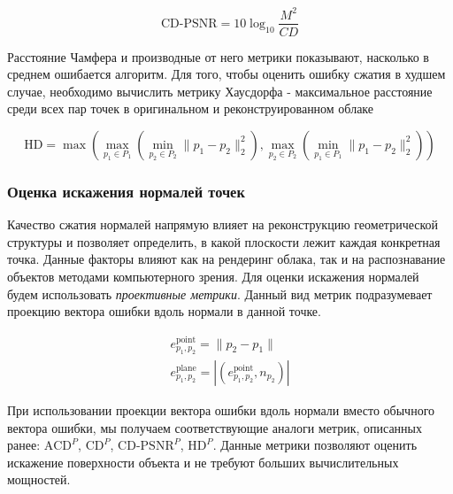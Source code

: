 \begin{equation} \label{eq:cd_psnr_chamfer}
    \text{CD-PSNR} = 10 \log_{10} \frac{M^{2}}{CD}
\end{equation}


Расстояние Чамфера и производные от него метрики показывают, насколько в среднем
ошибается алгоритм. Для того, чтобы оценить ошибку сжатия в худшем случае,
необходимо вычислить метрику Хаусдорфа - максимальное расстояние среди всех пар
точек в оригинальном и реконструированном облаке

\begin{equation} \label{eq:cloud_hausdorff}
    \text{HD} = \max \left(
        \max_{p_{1} \in P_{1}} \left(
            \min_{p_{2} \in P_{2}} \lVert p_{1} - p_{2} \rVert_{2}^{2}
         \right),
        \max_{p_{2} \in P_{2}} \left(
            \min_{p_{1} \in P_{1}} \lVert p_{1} - p_{2} \rVert_{2}^{2}
         \right)
    \right)
\end{equation}

\subsubsection{Оценка искажения нормалей точек}


Качество сжатия нормалей напрямую влияет на реконструкцию геометрической
структуры и позволяет определить, в какой плоскости лежит каждая конкретная
точка. Данные факторы влияют как на рендеринг облака, так и на распознавание
объектов методами компьютерного зрения. Для оценки искажения нормалей будем
использовать \textit{проективные метрики}\cite{PCQA}. Данный вид метрик
подразумевает проекцию вектора ошибки вдоль нормали в данной точке.

\begin{gather} \label{eq:point_to_plane_error}
    e_{p_{1}, p_{2}}^{\text{point}} = \lVert p_{2} - p_{1} \rVert \nonumber \\
    e_{p_{1}, p_{2}}^{\text{plane}} = \left|\left(
        e_{p_{1}, p_{2}}^{\text{point}}, n_{p_{2}}
    \right)\right|
\end{gather}

При использовании проекции вектора ошибки вдоль нормали вместо обычного вектора
ошибки, мы получаем соответствующие аналоги метрик, описанных ранее:
$\text{ACD}^{P}$, $\text{CD}^{P}$, $\text{CD-PSNR}^{P}$, $\text{HD}^{P}$. Данные
метрики позволяют оценить искажение поверхности объекта и не требуют больших
вычислительных мощностей.


